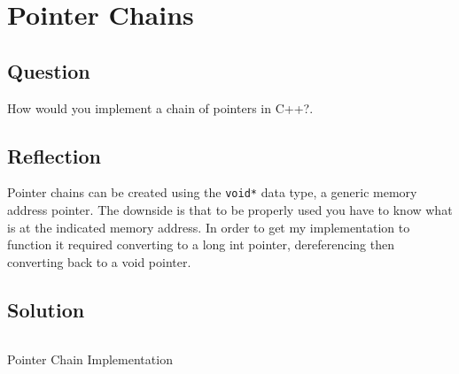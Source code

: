 \section{Pointer Chains}
    \subsection*{Question}
        How would you implement a chain of pointers in C++?.

    \subsection*{Reflection}
        Pointer chains can be created using the \texttt{void*}
        data type, a generic memory address pointer.
        The downside is that to be properly used you have to know what is at the 
        indicated memory address. In order to get my implementation to function
        it required converting to a long int pointer, dereferencing then converting
        back to a void pointer.

    \subsection*{Solution}
        \begin{listing}[H]
            \inputminted{cpp}{../Tasks/08-PointerChains/Main.cpp}
            \caption{Pointer Chain Implementation}
        \end{listing}